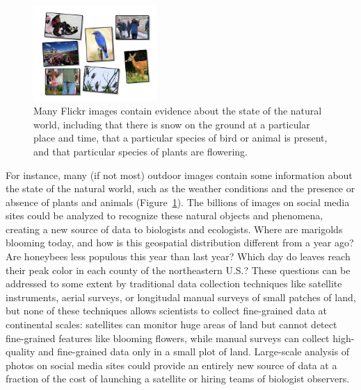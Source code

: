 \documentclass[10pt,journal,compsoc]{IEEEtran}
\begin{document}
\begin{figure}[t]
\begin{center}
\includegraphics[width=0.42\textwidth,clip,trim=2cm 1cm 1cm 1cm]{figs/natural-images.pdf}
\end{center}
\caption{Many Flickr images contain evidence about the state of the natural world, including
that there is snow on the ground at a particular place and time, that a particular species of bird or animal is present,
and that particular species of plants are flowering.}
\label{fig:nature}
\vspace{-12pt}
\end{figure}

For instance, many (if not most) outdoor images contain some
information about the state of the natural world, such as the weather
conditions and the presence or absence of plants and animals
(Figure~\ref{fig:nature}).  The billions of images on social media
sites could be analyzed to recognize these natural objects and
phenomena, creating a new source of data to biologists and ecologists.
Where are marigolds blooming
today, and how is this geospatial distribution different from a year
ago? Are honeybees less populous this year than last year? Which day
do leaves reach their peak color in each county of the northeastern
U.S.?  These questions can be addressed to some extent by traditional
data collection techniques like satellite instruments, aerial surveys,
or longitudal manual surveys of small patches of land, but none of
these techniques allows scientists to collect fine-grained data at
continental scales: satellites can monitor huge areas of land but cannot 
detect fine-grained features like blooming flowers, while manual surveys
can collect high-quality and fine-grained data only in a small plot of land.
Large-scale analysis of photos on social media
sites could provide an entirely new source of data at a fraction of the cost
of launching a satellite or hiring teams of biologist observers.
\end{document}
